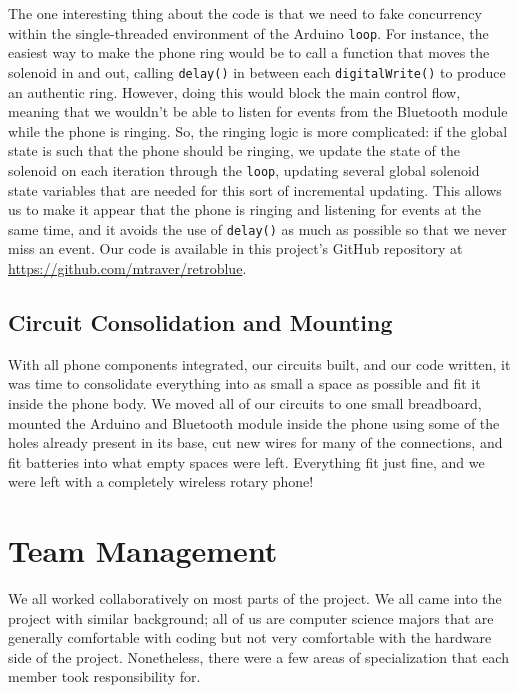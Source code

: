 \documentclass{es50report}
\begin{document}
    The one interesting thing about the code is that we need to fake concurrency within the single-threaded environment of the Arduino \verb+loop+. For instance, the easiest way to make the phone ring would be to call a function that moves the solenoid in and out, calling \verb+delay()+ in between each \verb+digitalWrite()+ to produce an authentic ring. However, doing this would block the main control flow, meaning that we wouldn't be able to listen for events from the Bluetooth module while the phone is ringing. So, the ringing logic is more complicated: if the global state is such that the phone should be ringing, we update the state of the solenoid on each iteration through the \verb+loop+, updating several global solenoid state variables that are needed for this sort of incremental updating. This allows us to make it appear that the phone is ringing and listening for events at the same time, and it avoids the use of \verb+delay()+ as much as possible so that we never miss an event. Our code is available in this project's GitHub repository at \url{https://github.com/mtraver/retroblue}.


    \subsection{Circuit Consolidation and Mounting}
    With all phone components integrated, our circuits built, and our code written, it was time to consolidate everything into as small a space as possible and fit it inside the phone body. We moved all of our circuits to one small breadboard, mounted the Arduino and Bluetooth module inside the phone using some of the holes already present in its base, cut new wires for many of the connections, and fit batteries into what empty spaces were left. Everything fit just fine, and we were left with a completely wireless rotary phone!

    \section{Team Management}
        We all worked collaboratively on most parts of the project. We all came into the project with similar background; all of us are computer science majors that are generally comfortable with coding but not very comfortable with the hardware side of the project. Nonetheless, there were a few areas of specialization that each member took responsibility for.
\end{document}
